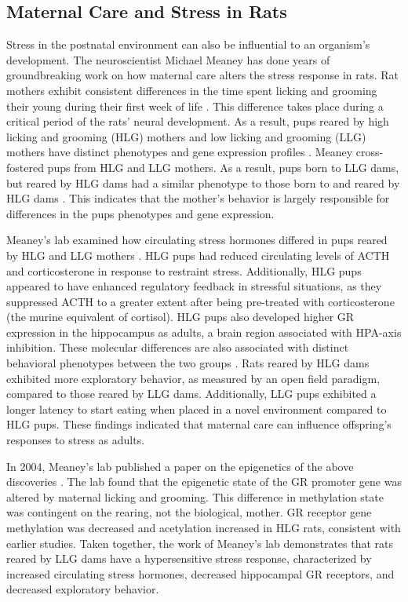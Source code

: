 \documentclass[12pt,twoside]{reedthesis}
\begin{document}
 \subsection{Maternal Care and Stress in Rats}
  
Stress in the postnatal
environment can also be influential to an organism's development. The
neuroscientist Michael Meaney has done years of groundbreaking work on how maternal
care alters the stress response in rats.  Rat mothers exhibit consistent differences in the time spent licking and grooming
their young during their first week of life \citep{meaney_early_1996}. This difference takes place during a critical period
of the rats' neural development. As a result, pups reared by high licking and grooming
(HLG) mothers and low licking and grooming (LLG) mothers have distinct
phenotypes and gene expression profiles \citep{weaver_epigenetic_2004}. Meaney cross-fostered pups from HLG and
LLG mothers. As a result, pups born to LLG dams, but reared by HLG dams had a
similar phenotype to those born to and reared by HLG dams
\citep{francis_nongenomic_1999}. This indicates that the mother's behavior is
largely responsible for differences in the pups phenotypes and gene expression.

Meaney's lab examined how circulating stress hormones differed in pups
reared by HLG and LLG mothers \citep{liu_maternal_2000}. HLG pups had reduced circulating levels of ACTH and
corticosterone in response to restraint stress. Additionally, HLG pups appeared
to have enhanced regulatory feedback in stressful situations, as they suppressed
ACTH to a greater extent after being pre-treated with corticosterone (the murine
equivalent of cortisol). HLG pups
also developed higher GR expression in the hippocampus as adults, a brain region
associated with HPA-axis inhibition. These molecular differences are also
associated with distinct behavioral phenotypes between the
two groups \citep{caldji_maternal_1998}. Rats reared by HLG dams exhibited more exploratory
behavior, as measured by an open field paradigm, compared to those reared by LLG
dams. Additionally, LLG pups exhibited a longer latency to start eating when
placed in a novel environment compared to HLG pups. These findings
indicated that maternal care can influence offspring's responses to stress as
adults.

In 2004, Meaney's lab
published a paper on the epigenetics of the above discoveries
\citep{weaver_epigenetic_2004}. The lab found that the
epigenetic state of the GR promoter gene was altered by maternal licking and
grooming. This difference in methylation state was contingent on the rearing,
not the biological, mother.  GR receptor gene methylation was decreased and
acetylation increased in HLG rats, consistent with earlier studies. Taken
together, the work of Meaney's lab demonstrates that rats reared by LLG dams have a
hypersensitive stress response, characterized by increased circulating stress
hormones, decreased hippocampal GR receptors, and decreased exploratory
behavior.
\end{document}
